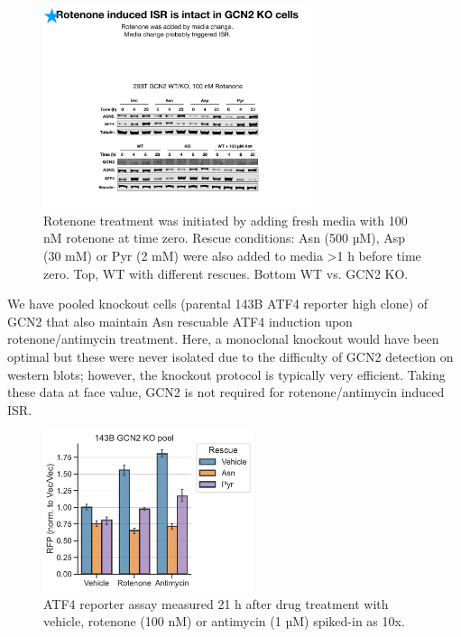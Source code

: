 \begin{figure}[ht]
    \centering
    \includegraphics[width=0.70\textwidth]{figures/sapp/ISR/293T_GCN2_ISR.pdf}
    \caption[ATF4 post mito inhib. GCN2 KO, western]{
    Rotenone treatment was initiated by adding fresh media with 100 nM rotenone at time zero.
    Rescue conditions: Asn (500 µM), Asp (30 mM) or Pyr (2 mM) were also added to media >1 h before time zero.
    Top, WT with different rescues.
    Bottom WT vs. GCN2 KO.
    }
    \label{fig:sapp:ISR:293T_GCN2_ISR}
\end{figure}


\FloatBarrier
We have pooled knockout cells (parental 143B ATF4 reporter high clone) of GCN2 that also maintain Asn rescuable ATF4 induction upon rotenone/antimycin treatment.
Here, a monoclonal knockout would have been optimal but these were never isolated due to the difficulty of GCN2 detection on western blots; however, the knockout protocol is typically very efficient.
Taking these data at face value, GCN2 is not required for rotenone/antimycin induced ISR.

\begin{figure}[ht]
    \centering
    \includegraphics[width=0.55\textwidth]{figures/sapp/ISR/143B_GCN2_ISR.pdf}
    \caption[ATF4 post mito inhib. GCN2 KO, reporter]{
    ATF4 reporter assay measured 21 h after drug treatment with vehicle, rotenone (100 nM) or antimycin (1 µM) spiked-in as 10x.
    }
    \label{fig:sapp:ISR:143B_GCN2_ISR}
\end{figure}


